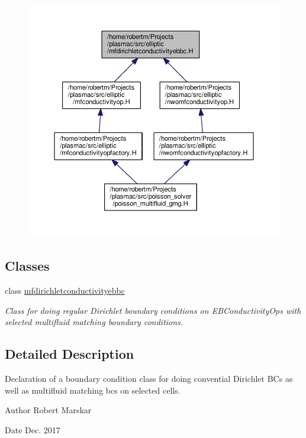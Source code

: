 \begin{figure}[H]
\begin{center}
\leavevmode
\includegraphics[width=350pt]{mfdirichletconductivityebbc_8H__dep__incl}
\end{center}
\end{figure}
\subsection*{Classes}
\begin{DoxyCompactItemize}
\item 
class \hyperlink{classmfdirichletconductivityebbc}{mfdirichletconductivityebbc}
\begin{DoxyCompactList}\small\item\em Class for doing regular Dirichlet boundary conditions on E\+B\+Conductivity\+Ops with selected multifluid matching boundary conditions. \end{DoxyCompactList}\end{DoxyCompactItemize}


\subsection{Detailed Description}
Declaration of a boundary condition class for doing convential Dirichlet B\+Cs as well as multifluid matching bcs on selected cells. 

\begin{DoxyAuthor}{Author}
Robert Marskar 
\end{DoxyAuthor}
\begin{DoxyDate}{Date}
Dec. 2017 
\end{DoxyDate}
